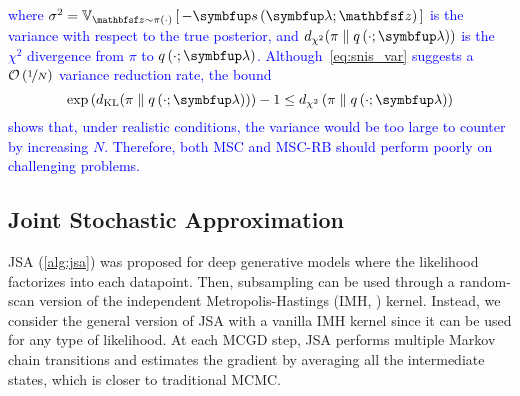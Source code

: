%
\textcolor{blue}{
where \(\sigma^2 = \Vsub{\rvvz \sim \pi\left(\cdot\right)}{ -\vs\left(\vlambda; \rvvz \right) }\) is the variance with respect to the true posterior, and \(\DChi{\pi}{q\left(\cdot; \vlambda\right)}\) is the \(\chi^2\) divergence from \(\pi\) to \(q\left(\cdot; \vlambda\right)\).
Although~\cref{eq:snis_var} suggests a \(\mathcal{O}\left(\nicefrac{1}{N}\right)\) variance reduction rate, the bound
%
\[
\exp\left( \DKL{\pi}{q\left(\cdot; \vlambda\right)} \right) - 1 \leq  d_{\chi^2}\left(\pi \parallel q\left(\cdot; \vlambda\right) \right)
\]
shows that, under realistic conditions, the variance would be too large to counter by increasing \(N\).
Therefore, both MSC and MSC-RB should perform poorly on challenging problems.
}

\vspace{-0.1in}
\subsection{Joint Stochastic Approximation}
\vspace{-0.1in}
JSA (\cref{alg:jsa}) was proposed for deep generative models where the likelihood factorizes into each datapoint.
Then, subsampling can be used through a random-scan version of the independent Metropolis-Hastings (IMH, \citealt{hastings_monte_1970}) kernel.
Instead, we consider the general version of JSA with a vanilla IMH kernel since it can be used for any type of likelihood.
At each MCGD step, JSA performs multiple Markov chain transitions and estimates the gradient by averaging all the intermediate states, which is closer to traditional MCMC.

\vspace{-0.1in}
